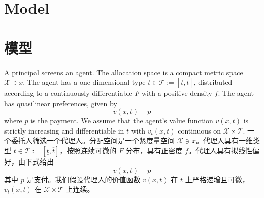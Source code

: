 \documentclass[12pt,letterpaper]{article}
\newenvironment{original}{\color{black}\noindent}{}
\newenvironment{translation}{\color{blue}\noindent}{}
\theoremstyle{plain}
\theoremstyle{definition}
\theoremstyle{remark}
\renewcommand{\1}{\mathds{1}}
\theoremstyle{definition}
\begin{document}
\begin{original}
\section{Model}\label{sec:model}
\end{original}
\begin{translation}
\section{模型}\label{sec:model}
\end{translation}

\begin{original}
A principal screens an agent. The allocation space is a compact metric space $\mathcal{X} \ni x$. The agent has a one-dimensional type $t \in \mathcal{T}:=[\underline{t}, \overline{t}]$, distributed according to a continuously differentiable $F$ with a positive density $f$. The agent has quasilinear preferences, given by
\[v(x, t) - p\]
where $p$ is the payment. We assume that the agent's value function $v(x, t)$ is strictly increasing and differentiable in $t$ with $v_t(x, t)$ continuous on $\mathcal{X} \times \mathcal{T}$.
\end{original}
\begin{translation}
一个委托人筛选一个代理人。分配空间是一个紧度量空间 $\mathcal{X} \ni x$。代理人具有一维类型 $t \in \mathcal{T}:=[\underline{t}, \overline{t}]$，按照连续可微的 $F$ 分布，具有正密度 $f$。代理人具有拟线性偏好，由下式给出
\[v(x, t) - p\]
其中 $p$ 是支付。我们假设代理人的价值函数 $v(x, t)$ 在 $t$ 上严格递增且可微，$v_t(x, t)$ 在 $\mathcal{X} \times \mathcal{T}$ 上连续。
\end{translation}
\end{document}
